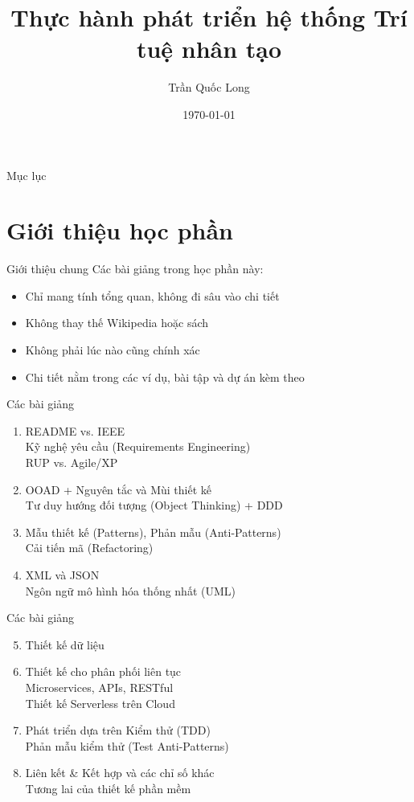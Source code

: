 \documentclass{beamer}
\title{Thực hành phát triển hệ thống Trí tuệ nhân tạo}
\author{Trần Quốc Long}
\institute{Trường ĐH Công nghệ, ĐHQG Hà Nội}
\date{\today}
\begin{document}
\begin{frame}
    \titlepage
\end{frame}

\begin{frame}{Mục lục}
    \tableofcontents
\end{frame}

\section{Giới thiệu học phần}

\begin{frame}{Giới thiệu chung}
    Các bài giảng trong học phần này:
    \begin{itemize}
        \item Chỉ mang tính tổng quan, không đi sâu vào chi tiết
        \item Không thay thế Wikipedia hoặc sách
        \item Không phải lúc nào cũng chính xác
        \item Chi tiết nằm trong các ví dụ, bài tập và dự án kèm theo
    \end{itemize}
\end{frame}

\begin{frame}{Các bài giảng}
    \begin{enumerate}
        \item README vs. IEEE
        \\ Kỹ nghệ yêu cầu (Requirements Engineering)
        \\ RUP vs. Agile/XP
        \item OOAD + Nguyên tắc và Mùi thiết kế
        \\ Tư duy hướng đối tượng (Object Thinking) + DDD
        \item Mẫu thiết kế (Patterns), Phản mẫu (Anti-Patterns)\\Cải tiến mã (Refactoring)
        \item XML và JSON
        \\ Ngôn ngữ mô hình hóa thống nhất (UML)
    \end{enumerate}        
\end{frame}


\begin{frame}{Các bài giảng}
    \begin{enumerate}
        \setcounter{enumi}{4}
        \item Thiết kế dữ liệu
        \item Thiết kế cho phân phối liên tục
        \\Microservices, APIs, RESTful
        \\Thiết kế Serverless trên Cloud
        \item Phát triển dựa trên Kiểm thử (TDD)
        \\Phản mẫu kiểm thử (Test Anti-Patterns)
        \item Liên kết \& Kết hợp và các chỉ số khác
        \\Tương lai của thiết kế phần mềm
    \end{enumerate}        
\end{frame}
\end{document}
